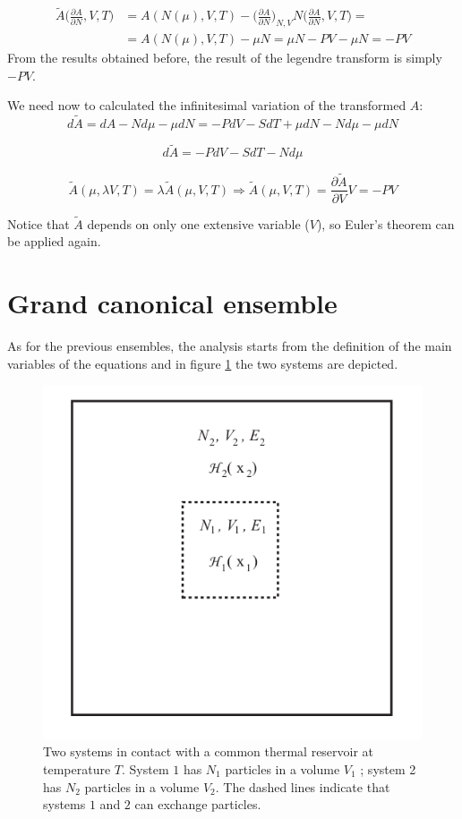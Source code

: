 	\begin{align*}
		\tilde{A}\biggl(\frac{\partial A}{\partial N}, V, T\biggr) &= A(N(\mu), V, T)-\biggl(\frac{\partial A}{\partial N}\biggr)_{N, V}N\biggl(\frac{\partial A}{\partial N}, V, T\biggr) = \\
																															 &=A(N(\mu), V, T) - \mu N = \mu N - PV - \mu N = -PV
	\end{align*}
	From the results obtained before, the result of the legendre transform is simply $-PV$. 
	
	We need now to calculated the infinitesimal variation of the transformed $A$:
	$$d\tilde{A} = dA - Nd \mu -\mu dN = -PdV - SdT + \mu dN -Nd\mu - \mu dN$$

	$$d\tilde{A} = -PdV - SdT - Nd\mu$$

	$$\tilde{A}(\mu, \lambda V, T) = \lambda\tilde{A}(\mu, V, T)\Rightarrow \tilde{A}(\mu, V, T) = \frac{\partial \tilde{A}}{\partial V}V = -PV$$
	
	Notice that $\tilde{A}$ depends on only one extensive variable ($V$), so Euler's theorem can be applied again.
	
	
\section{Grand canonical ensemble}
As for the previous ensembles, the analysis starts from the definition of the main variables of the equations and in figure \ref{fig:grand} the two systems are depicted. 

\begin{figure}
\center
\includegraphics[scale=0.5]{grand.png}
\caption{Two systems in contact with a common thermal reservoir at temperature $T$. System $1$ has $N_1$ particles in a volume $V_1$ ; system 2 has $N_2$ particles in a volume $V_2$. The dashed lines indicate that systems $1$ and $2$ can exchange particles.}
\label{fig:grand}
\end{figure}

